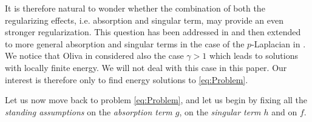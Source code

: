 \documentclass[11pt,a4paper]{amsart}
\theoremstyle{definition}
\theoremstyle{plain}
\numberwithin{equation}{section}
\begin{document}
It is therefore natural to wonder whether the combination of both the regularizing effects, i.e. absorption and singular term, may provide an even stronger regularization. This question has been addressed in \cite{DeCOl} and then extended to more general absorption and singular terms in the case of the $p$-Laplacian in \cite{Oliva}. We notice that Oliva in \cite{Oliva} considered also the case $\gamma >1$ which leads to solutions with locally finite energy. We will not deal with this case in this paper.
Our interest is therefore only to find energy solutions to \eqref{eq:Problem}. 
\medskip

Let us now move back to problem \eqref{eq:Problem}, and let us begin
by fixing all the \emph{standing assumptions} on the \emph{absorption term $g$}, on the \emph{singular term $h$} and on $f$.
\medskip
\end{document}
